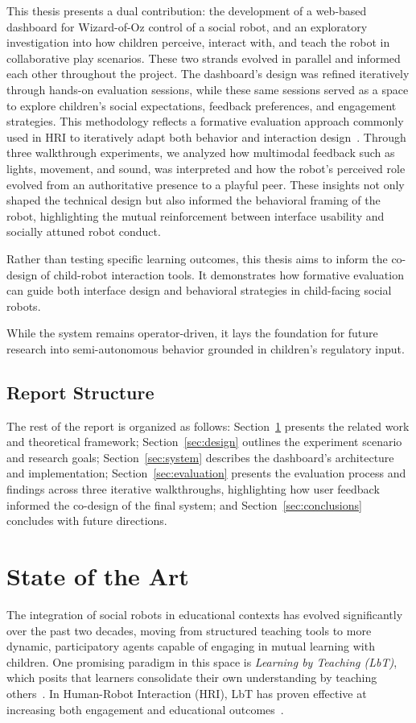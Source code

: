\documentclass[a4paper]{usiinfbachelorproject}
\begin{document}
This thesis presents a dual contribution: the development of a web-based dashboard for Wizard-of-Oz control of a social robot, and an exploratory investigation into how children perceive, interact with, and teach the robot in collaborative play scenarios.
These two strands evolved in parallel and informed each other throughout the project.
The dashboard's design was refined iteratively through hands-on evaluation sessions, while these same sessions served as a space to explore children's social expectations, feedback preferences, and engagement strategies.
This methodology reflects a formative evaluation approach commonly used in HRI to iteratively adapt both behavior and interaction design~\cite{love2024teachable}.
Through three walkthrough experiments, we analyzed how multimodal feedback such as lights, movement, and sound, was interpreted and how the robot's perceived role evolved from an authoritative presence to a playful peer.
These insights not only shaped the technical design but also informed the behavioral framing of the robot, highlighting the mutual reinforcement between interface usability and socially attuned robot conduct.

Rather than testing specific learning outcomes, this thesis aims to inform the co-design of child-robot interaction tools.
It demonstrates how formative evaluation can guide both interface design and behavioral strategies in child-facing social robots.

While the system remains operator-driven, it lays the foundation for future research into semi-autonomous behavior grounded in children's regulatory input.

\subsection{\textbf{Report Structure}}
The rest of the report is organized as follows: Section~\ref{sec:background} presents the related work and theoretical framework; Section~\ref{sec:design} outlines the experiment scenario and research goals; Section~\ref{sec:system} describes the dashboard's architecture and implementation; Section~\ref{sec:evaluation} presents the evaluation process and findings across three iterative walkthroughs, highlighting how user feedback informed the co-design of the final system; and Section~\ref{sec:conclusions} concludes with future directions.

\section{\textbf{State of the Art}}\label{sec:background}
The integration of social robots in educational contexts has evolved significantly over the past two decades, moving from structured teaching tools to more dynamic, participatory agents capable of engaging in mutual learning with children.
One promising paradigm in this space is \textit{Learning by Teaching (LbT)}, which posits that learners consolidate their own understanding by teaching others~\cite{biswas2005learning}.
In Human-Robot Interaction (HRI), LbT has proven effective at increasing both engagement and educational outcomes~\cite{10.5898/JHRI.1.1.Tanaka, love2024teachable}.
\end{document}
